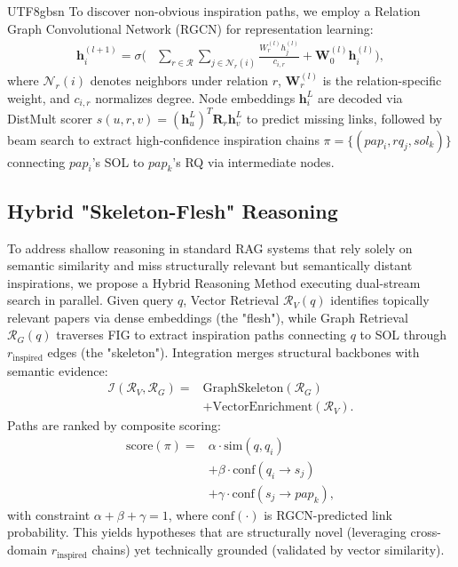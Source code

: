 \documentclass[11pt]{article}
\begin{document}
\begin{CJK}{UTF8}{gbsn}
To discover non-obvious inspiration paths, we employ a Relation Graph Convolutional Network (RGCN) for representation learning:
\begin{equation}
\begin{split}
    \mathbf{h}_i^{(l+1)} = \sigma \Bigg( &\sum_{r \in \mathcal{R}} \sum_{j \in \mathcal{N}_r(i)} \frac{{W}_r^{(l)} {h}_j^{(l)}}{c_{i,r}} + \mathbf{W}_0^{(l)} \mathbf{h}_i^{(l)} \Bigg),
\end{split}
\end{equation}
where $\mathcal{N}_r(i)$ denotes neighbors under relation $r$, $\mathbf{W}_r^{(l)}$ is the relation-specific weight, and $c_{i,r}$ normalizes degree. Node embeddings $\mathbf{h}_i^L$ are decoded via DistMult scorer $s(u,r,v) = (\mathbf{h}_u^L)^T \mathbf{R}_r \mathbf{h}_v^L$ to predict missing links, followed by beam search to extract high-confidence inspiration chains $\pi = \{(pap_i, rq_j, sol_k)\}$ connecting $pap_i$'s SOL to $pap_k$'s RQ via intermediate nodes.

\subsection{Hybrid "Skeleton-Flesh" Reasoning }
\label{sec:hybrid_reasoning}

To address shallow reasoning in standard RAG systems that rely solely on semantic similarity and miss structurally relevant but semantically distant inspirations, we propose a Hybrid Reasoning Method executing dual-stream search in parallel. Given query $q$, Vector Retrieval $\mathcal{R}_V(q)$ identifies topically relevant papers via dense embeddings (the "flesh"), while Graph Retrieval $\mathcal{R}_G(q)$ traverses FIG to extract inspiration paths connecting $q$ to SOL through $r_{\text{inspired}}$ edges (the "skeleton"). Integration merges structural backbones with semantic evidence:
\begin{equation}
\begin{split}
    \mathcal{I}(\mathcal{R}_V, \mathcal{R}_G) = &\text{GraphSkeleton}(\mathcal{R}_G) \\
    &+ \text{VectorEnrichment}(\mathcal{R}_V).
\end{split}
\end{equation}
Paths are ranked by composite scoring:
\begin{equation}
\begin{split}
    \text{score}(\pi) = &\alpha \cdot \text{sim}(q, q_i) \\
    &+ \beta \cdot \text{conf}(q_i \rightarrow s_j) \\
    &+ \gamma \cdot \text{conf}(s_j \rightarrow pap_k),
\end{split}
\end{equation}
with constraint $\alpha+\beta+\gamma=1$, where $\text{conf}(\cdot)$ is RGCN-predicted link probability. This yields hypotheses that are structurally novel (leveraging cross-domain $r_{\text{inspired}}$ chains) yet technically grounded (validated by vector similarity).


\end{CJK}
\end{document}
